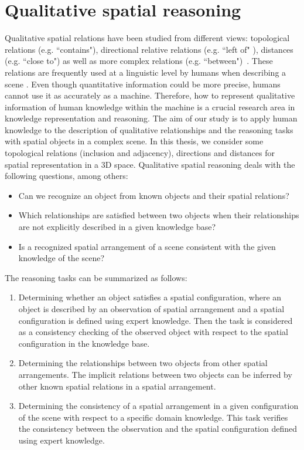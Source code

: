\documentclass{article}
\begin{document}
\section{Qualitative spatial reasoning}\label{sec:qsr}
Qualitative spatial relations have been studied from different views:
 topological relations (e.g. ``contains"), directional relative relations (e.g. ``left of" ), distances (e.g. ``close to") 
 as well as more complex relations (e.g. ``between")~\cite{Bloch2005fuzzy,freeman1975modelling,Hudelot2008fuzzy,kuipers1978modeling}. 
These relations are frequently used at a linguistic level by humans when describing a scene \cite{freksa1991qualitative}.
Even though quantitative information could be more precise, humans cannot use it as accurately as a machine.
Therefore, how to represent qualitative information of human knowledge within the machine is a crucial research area in knowledge representation and reasoning.
The aim of our study is to apply human knowledge to the description of qualitative relationships and the reasoning tasks with spatial objects in a complex scene.
In this thesis, we consider some topological relations (inclusion and adjacency), directions and distances for spatial representation in a 3D space.
Qualitative spatial reasoning deals with the following questions, among others:
 \begin{itemize}
  \item Can we recognize an object from known objects and their spatial relations?
  \item Which relationships are satisfied between two objects when their relationships are not explicitly described in a given  knowledge base?
  \item Is a recognized spatial arrangement of a scene consistent with the given knowledge of the scene?
 \end{itemize}
 
 The reasoning tasks can be summarized as follows:
 \begin{enumerate}
  \item Determining whether an object satisfies a spatial configuration, where an object is described by an observation of spatial arrangement and 
  a spatial configuration is defined using expert knowledge. Then the task is considered as a consistency checking  of the observed object with respect to the spatial configuration in 
  the knowledge base.
  \item Determining the relationships between two objects from other spatial arrangements. The implicit relations between two objects can be inferred by other known spatial relations
  in a spatial arrangement.
  \item Determining the consistency of a spatial arrangement in a given configuration of the scene with respect to a specific domain knowledge. This task verifies the consistency
  between the observation and the spatial configuration defined using expert knowledge.
 \end{enumerate}
\end{document}
